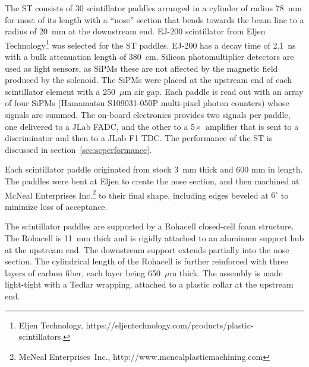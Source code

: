 The ST consists of 30 scintillator paddles arranged in a cylinder of radius 78~mm for
most of its length with a ``nose'' section that bends towards the beam
line to a radius of 20~mm at the downstream end. EJ-200 scintillator from Eljen
Technology\footnote{Eljen Technology, https://eljentechnology.com/products/plastic-scintillators.} was
selected for the ST paddles. EJ-200 has a decay time of 2.1~ns with a bulk attenuation length
of 380~cm. Silicon photomultiplier detectors are used as light
sensors, as SiPMs these are not affected by the magnetic field produced by the solenoid. The SiPMs were placed
at the upstream end of each scintillator element with a 250~$\mu$m air gap.
Each paddle is read out with an array of four 
SiPMs (Hamamatsu S109031-050P multi-pixel photon counters) whose signals are summed. 
The on-board electronics provides two signals per paddle, one delivered to a JLab FADC, and the other to a 5$\times$~amplifier that is sent to a discriminator and then to a JLab F1 TDC. The performance of the ST is discussed in 
section~\ref{sec:scperformance}.

Each scintillator paddle originated from stock 3~mm thick and 600 mm in
length. The paddles were bent at Eljen to create the nose section, and then machined at McNeal Enterprises Inc.\footnote{McNeal
  Enterprises~Inc., http://www.mcnealplasticmachining.com} to their
final shape, including edges beveled at $6^\circ$ to minimize loss of
acceptance.

The scintillator paddles are supported by a Rohacell closed-cell foam
structure. The Rohacell is 11~mm thick and is rigidly attached to an
aluminum support hub at the upstream end. The downstream support
extends partially into the nose section. The cylindrical length of the Rohacell is further reinforced with three layers of carbon fiber, each layer being 650~$\mu$m thick. The assembly is made light-tight with a Tedlar wrapping, attached to a plastic collar at the upstream end.

